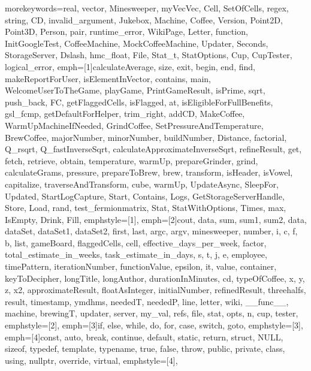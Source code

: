 {morekeywords={real, vector, Minesweeper, myVecVec, Cell, SetOfCells, regex, string, CD,
              invalid_argument, Jukebox, Machine, Coffee, Version, Point2D, Point3D, Person, pair,
              runtime_error, WikiPage, Letter, function, InitGoogleTest, CoffeeMachine,
              MockCoffeeMachine, Updater, Seconds, StorageServer, Dslash, hmc_float, File,
              Stat_t, StatOptions, Cup, CupTester, logical_error},
emph=[1]{calculateAverage, size, exit, begin, end, find, makeReportForUser, isElementInVector, contains,
         main, WelcomeUserToTheGame, playGame, PrintGameResult, isPrime, sqrt, push_back, FC,
         getFlaggedCells, isFlagged, at, isEligibleForFullBenefits, gsl_fcmp, getDefaultForHelper,
         trim_right, addCD, MakeCoffee, WarmUpMachineIfNeeded, GrindCoffee, SetPressureAndTemperature,
         BrewCoffee, majorNumber, minorNumber, buildNumber, Distance, factorial,
         Q_rsqrt, Q_fastInverseSqrt, calculateApproximateInverseSqrt, refineResult, get, fetch, retrieve,
         obtain, temperature, warmUp, prepareGrinder, grind, calculateGrams, pressure, prepareToBrew, brew,
         transform, isHeader, isVowel, capitalize, traverseAndTransform, cube, warmUp, UpdateAsync, SleepFor,
         Updated, StartLogCapture, Start, Contains, Logs, GetStorageServerHandle, Store, Load, rand,
         test_fermionmatrix, Stat, StatWithOptions, Times, max, IsEmpty, Drink, Fill},
emphstyle=[1]{\color{NavyBlue}}, %
emph=[2]{cout, data, sum, sum1, sum2, data, dataSet, dataSet1, dataSet2, first, last, argc, argv, minesweeper,
         number, i, c, f, b, list, gameBoard, flaggedCells, cell, effective_days_per_week, factor,
         total_estimate_in_weeks, task_estimate_in_days, s, t, j, e, employee, timePattern, iterationNumber,
         functionValue, epsilon, it, value, container, keyToDecipher, longTitle, longAuthor, durationInMinutes, cd,
         typeOfCoffee, x, y, z, x2, approximateResult, floatAsInteger, initialNumber, refinedResult,
         threehalfs, result, timestamp, ymdhms, neededT, neededP, line, letter, wiki, __func__, machine,
         brewingT, updater, server, my_val, refs, file, stat, opts, n, cup, tester},
emphstyle=[2]{\color{Orange}}, %
emph=[3]{if, else, while, do, for, case, switch, goto},
emphstyle=[3]{\color{violet}}, %
emph=[4]{const, auto, break, continue, default, static, return, struct, NULL, sizeof, typedef,
         template, typename, true, false, throw, public, private, class, using, nullptr, override, virtual},
emphstyle=[4]{\color{ProcessBlue}}, %
}
